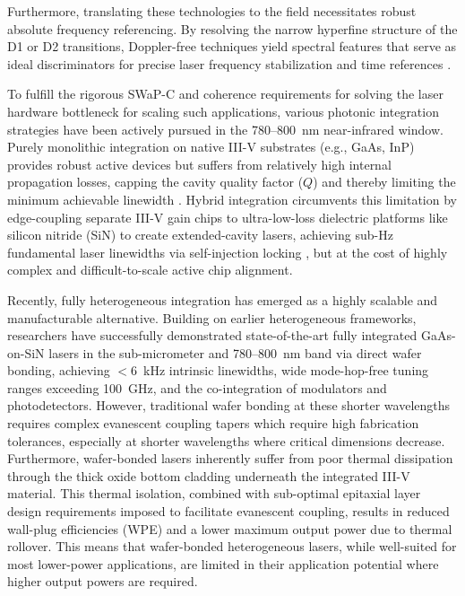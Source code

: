 \documentclass[%
 reprint,
 amsmath,amssymb,
 aps,
]{revtex4-2}
\begin{document}
Furthermore, translating these technologies to the field necessitates robust absolute frequency referencing. By resolving the narrow hyperfine structure of the D1 or D2 transitions, Doppler-free techniques yield spectral features that serve as ideal discriminators for precise laser frequency stabilization and time references \cite{debs2008piezo, strangfeld2022compact,newman2019architecture}.

To fulfill the rigorous SWaP-C and coherence requirements for solving the laser hardware bottleneck for scaling such applications, various photonic integration strategies have been actively pursued in the 780--800~nm near-infrared window. Purely monolithic integration on native III-V substrates (e.g., GaAs, InP) provides robust active devices but suffers from relatively high internal propagation losses, capping the cavity quality factor ($Q$) and thereby limiting the minimum achievable linewidth \cite{komljenovic2015widely, liang2021recent}. Hybrid integration circumvents this limitation by edge-coupling separate III-V gain chips to ultra-low-loss dielectric platforms like silicon nitride (SiN) to create extended-cavity lasers, achieving sub-Hz fundamental laser linewidths via self-injection locking \cite{isichenko2024sub}, but at the cost of highly complex and difficult-to-scale active chip alignment.

Recently, fully heterogeneous integration has emerged as a highly scalable and manufacturable alternative. Building on earlier heterogeneous frameworks, researchers have successfully demonstrated state-of-the-art fully integrated GaAs-on-SiN lasers in the sub-micrometer \cite{tran2022extending} and 780--800~nm band \cite{zhang2023photonic, castro2025integrated,thiel2026wafer} via direct wafer bonding, achieving $<$6~kHz intrinsic linewidths, wide mode-hop-free tuning ranges exceeding 100~GHz, and the co-integration of modulators and photodetectors. However, traditional wafer bonding at these shorter wavelengths requires complex evanescent coupling tapers which require high fabrication tolerances, especially at shorter wavelengths where critical dimensions decrease. Furthermore, wafer-bonded lasers inherently suffer from poor thermal dissipation through the thick oxide bottom cladding underneath the integrated III-V material. This thermal isolation, combined with sub-optimal epitaxial layer design requirements imposed to facilitate evanescent coupling, results in reduced wall-plug efficiencies (WPE) and a lower maximum output power due to thermal rollover. This means that wafer-bonded heterogeneous lasers, while well-suited for most lower-power applications, are limited in their application potential where higher output powers are required. 
\end{document}

